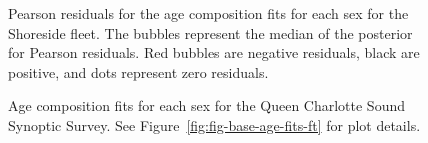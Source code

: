 \documentclass[11pt]{book}
\begin{document}
\begin{figure}[H]

{\centering {} 

}

\caption{Pearson residuals for the age composition fits for each sex for the Shoreside fleet. The bubbles represent the median of the posterior for Pearson residuals. Red bubbles are negative residuals, black are positive, and dots represent zero residuals.}\label{fig:fig-base-age-resids-ss}
\end{figure}
\clearpage




\begin{figure}[H]

{\centering {} 

}

\caption{Age composition fits for each sex for the Queen Charlotte Sound Synoptic Survey. See Figure~\ref{fig:fig-base-age-fits-ft} for plot details.}\label{fig:fig-base-age-fits-qcs}
\end{figure}
\end{document}
